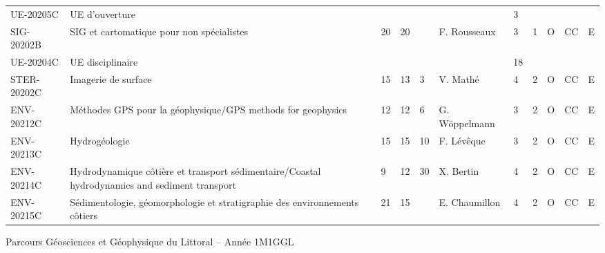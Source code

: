 \documentclass[a4paper,11pt]{article}
\begin{document}
{{\begin{tabular}{lllllllllll}
\rowcolor[HTML]{EFEFEF} 
UE-20205C                          & UE d'ouverture                                                                                &    &                            &    &                                    & 3                         &      &             &                            &                           \\
SIG-20202B                         & SIG et cartomatique pour non spécialistes                                                     & 20 & \cellcolor[HTML]{FD6864}20 &    & F. Rousseaux                       & \cellcolor[HTML]{FD6864}3 & 1    & O           & CC                         & E                         \\
\rowcolor[HTML]{EFEFEF} 
UE-20204C                          & UE disciplinaire                                                                              &    &                            &    &                                    & 18                        &      &             &                            &                           \\
\rowcolor[HTML]{BBDAFF} 
STER-20202C                        & Imagerie de surface                                                                           & 15 & 13                         & 3  & V. Mathé                           & \cellcolor[HTML]{FD6864}4 & 2    & O           & CC                         & E                         \\
ENV-20212C                         & \cellcolor[HTML]{FD6864}Méthodes GPS pour la géophysique/GPS methods for geophysics           & 12 & 12                         & 6  & G. Wöppelmann                      & \cellcolor[HTML]{FD6864}3 & 2    & O           & CC                         & E                         \\
ENV-20213C                         & Hydrogéologie                                                                                 & 15 & 15                         & 10 & F. Lévêque                         & \cellcolor[HTML]{FD6864}3 & 2    & O           & CC                         & E                         \\
ENV-20214C                         & Hydrodynamique côtière et transport sédimentaire/Coastal hydrodynamics and sediment transport & 9  & 12                         & 30 & X. Bertin                          & \cellcolor[HTML]{FD6864}4 & 2    & O           & CC                         & E                         \\
\rowcolor[HTML]{FD6864} 
ENV-20215C                         & Sédimentologie, géomorphologie et stratigraphie des environnements côtiers                    & 21 & 15                         &    & E. Chaumillon                      & 4                         & 2    & O           & CC                         & E                        
\end{tabular}}
}{Parcours Géosciences et Géophysique du Littoral -- Année 1}{M1GGL}
\end{document}
